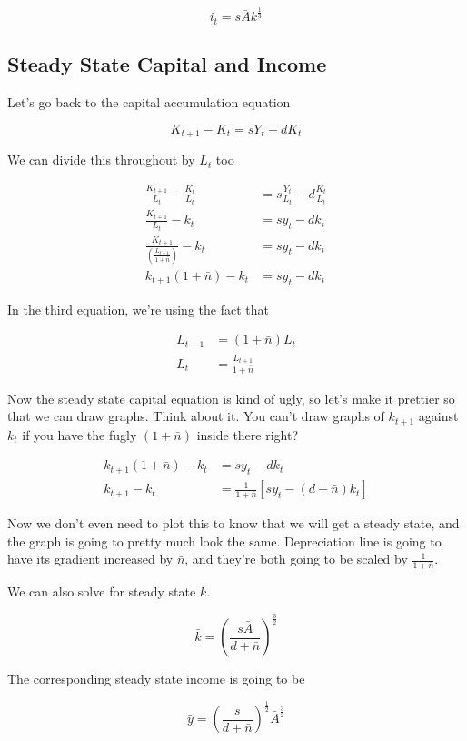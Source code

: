 \documentclass[11pt]{scrartcl}
\newcommand{\oneth}{\ensuremath{\frac{1}{3}}}
\begin{document}
\[i_t = s\bar{A}k^\oneth \]

\subsection{Steady State Capital and Income}

Let's go back to the capital accumulation equation

\[K_{t+1} - K_t = sY_t - dK_t \]

We can divide this throughout by $L_t$ too

\begin{align*}
\frac{K_{t+1}}{L_t} - \frac{K_t}{L_t} &= s\frac{Y_t}{L_t} - d\frac{K_t}{L_t} \\
\frac{K_{t+1}}{L_t} - k_t &= sy_t - dk_t \\
\frac{K_{t+1}}{\left(\frac{L_{t+1}}{1+\bar{n}}\right)} - k_t &= sy_t - dk_t \\
k_{t+1} (1+\bar{n}) - k_t &= sy_t - dk_t
\end{align*}

In the third equation, we're using the fact that

\begin{align*}
L_{t+1} &= (1+\bar{n})L_t \\
L_t &= \frac{L_{t+1}}{1+\bar{n}}
\end{align*}

Now the steady state capital equation is kind of ugly, so let's make it prettier so that we can draw graphs. Think about it. You can't draw graphs of $k_{t+1}$ against $k_t$ if you have the fugly $(1+\bar{n})$ inside there right?

\begin{align*}
k_{t+1} (1+\bar{n}) - k_t &= sy_t - dk_t \\
k_{t+1} - k_t &= \frac{1}{1+\bar{n}}\left[sy_t - (d + \bar{n})k_t\right]
\end{align*}

Now we don't even need to plot this to know that we will get a steady state, and the graph is going to pretty much look the same. Depreciation line is going to have its gradient increased by $\bar{n}$, and they're both going to be scaled by $\frac{1}{1+\bar{n}}$. 

We can also solve for steady state $\bar{k}$.

\[\bar{k} = \left(\frac{s\bar{A}}{d+\bar{n}}\right)^\frac{3}{2} \]

The corresponding steady state income is going to be 

\[\bar{y} = \left(\frac{s}{d+\bar{n}}\right)^\frac{1}{2} \bar{A}^\frac{3}{2}\]
\end{document}
